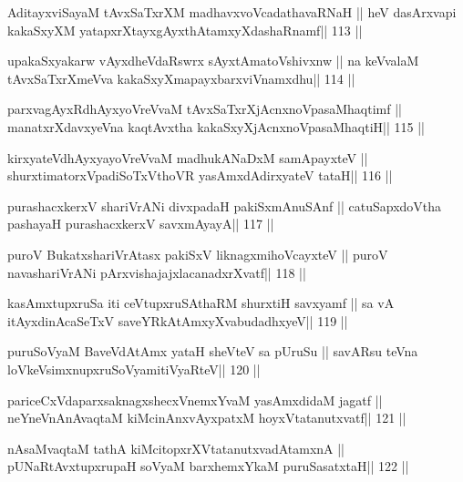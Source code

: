\begin{shl}
AditayxviSayaM tAvxSaTxrXM madhavxvoVcadathavaRNaH ||
heV dasArxvapi kakaSxyXM yatapxrXtayxgAyxthAtamxyXdashaRnamf\hfill || 113 ||
\end{shl}

\begin{shl}
upakaSxyakarw vAyxdheVdaRswrx sAyxtAmatoV\s shivxnw ||
na keVvalaM tAvxSaTxrXmeVva kakaSxyXmapayxbarxviVnamxdhu\hfill || 114 ||
\end{shl}

\begin{shl}
parxvagAyxRdhAyxyoVreVvaM tAvxSaTxrXjAcnxnoVpasaMhaqtimf ||
manatxrXdavxyeVna kaqtAvx\s tha kakaSxyXjAcnxnoVpasaMhaqtiH\hfill || 115 ||
\end{shl}

\begin{shl}
kirxyateV\s dhAyxyayoVreVvaM madhukANaDxM samApayxteV ||
shurxtimatorxVpadiSoTxV\s thoVR yasAmxdAdirxyateV tataH\hfill || 116 ||
\end{shl}

\begin{shl}
purashacxkerxV shariVrANi divxpadaH pakiSxmAnuSAnf ||
catuSapxdoV\s tha pashayaH purashacxkerxV savxmAyayA\hfill || 117 ||
\end{shl}

\begin{shl}
puroV BukatxshariVrAtasx pakiSxV liknagxmihoVcayxteV ||
puroV navashariVrANi pArxvishajajxlacanadxrXvatf\hfill || 118 ||
\end{shl}

\begin{shl}
kasAmxtupxruSa iti ceVtupxruSAthaRM shurxtiH savxyamf ||
sa vA itAyxdinA\s\s caSeTxV saveYRkAtAmxyXvabudadhxyeV\hfill || 119 ||
\end{shl}

\begin{shl}
puruSoV\s yaM BaveVdAtAmx yataH sheVteV sa pUruSu ||
savARsu teVna loVkeV\s simxnupxruSoV\s yamitiVyaRteV\hfill || 120 ||
\end{shl}

\begin{shl}
pariceCxVdaparxsaknagxshecxVnemxYvaM yasAmxdidaM jagatf ||
neYneVnAnAvaqtaM kiMcinAnxvAyxpatxM hoyxVtatanutxvatf\hfill || 121 ||
\end{shl}

\begin{shl}
nAsaMvaqtaM tathA kiMcitopxrXVtatanutxvadAtamxnA ||
pUNaRtAvxtupxrupaH soV\s yaM barxhemxYkaM puruSasatxtaH\hfill || 122 ||
\end{shl}


